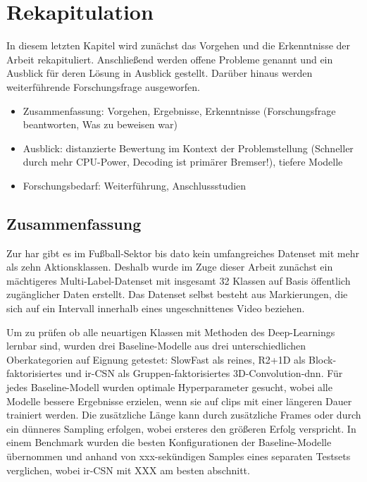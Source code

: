 \chapter{Rekapitulation}
\label{ch:zusammenfassung}

In diesem letzten Kapitel wird zunächst das Vorgehen und die Erkenntnisse der Arbeit rekapituliert.
Anschließend werden offene Probleme genannt und ein Ausblick für deren Lösung in Ausblick gestellt.
Darüber hinaus werden weiterführende Forschungsfrage ausgeworfen.

\begin{tcolorbox}[title=WIP]
 \begin{itemize}
  \item Zusammenfassung: Vorgehen, Ergebnisse, Erkenntnisse (Forschungsfrage beantworten, Was zu beweisen war)
  \item Ausblick: distanzierte Bewertung im Kontext der Problemstellung (Schneller durch mehr CPU-Power, Decoding ist primärer Bremser!), tiefere Modelle
  \item Forschungsbedarf: Weiterführung, Anschlussstudien
 \end{itemize}
 \end{tcolorbox}

\section{Zusammenfassung}
\label{sec:rekapitulation}

Zur \gls{har} gibt es im Fußball-Sektor bis dato kein umfangreiches Datenset mit mehr als zehn Aktionsklassen.
Deshalb wurde im Zuge dieser Arbeit zunächst ein mächtigeres Multi-Label-Datenset mit insgesamt 32 Klassen auf Basis öffentlich zugänglicher Daten erstellt.
Das Datenset selbst besteht aus Markierungen, die sich auf ein Intervall innerhalb eines ungeschnittenes Video beziehen.

Um zu prüfen ob alle neuartigen Klassen mit Methoden des Deep-Learnings lernbar sind, wurden drei Baseline-Modelle aus drei unterschiedlichen Oberkategorien auf Eignung getestet:
SlowFast als reines, R2+1D als Block-faktorisiertes und ir-CSN als Gruppen-faktorisiertes 3D-Convolution-\gls{dnn}.
Für jedes Baseline-Modell wurden optimale Hyperparameter gesucht, wobei alle Modelle bessere Ergebnisse erzielen, wenn sie auf \glspl{clip} mit einer längeren Dauer trainiert werden.
Die zusätzliche Länge kann durch zusätzliche Frames oder durch ein dünneres Sampling erfolgen, wobei ersteres den größeren Erfolg verspricht.
In einem Benchmark wurden die besten Konfigurationen der Baseline-Modelle übernommen und anhand von xxx-sekündigen Samples eines separaten Testsets verglichen, wobei ir-CSN mit XXX am besten abschnitt.

